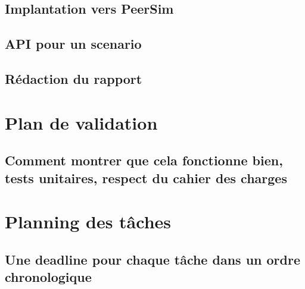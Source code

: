 \documentclass{article}
\begin{document}
			\subsection{Implantation vers PeerSim}
			\subsection{API pour un scenario}
			\subsection{Rédaction du rapport}

		\section{Plan de validation}
			\subsection{Comment montrer que cela fonctionne bien, tests unitaires, respect du cahier des charges}
		\section{Planning des tâches}
			\subsection{Une deadline pour chaque tâche dans un ordre chronologique}
\end{document}

